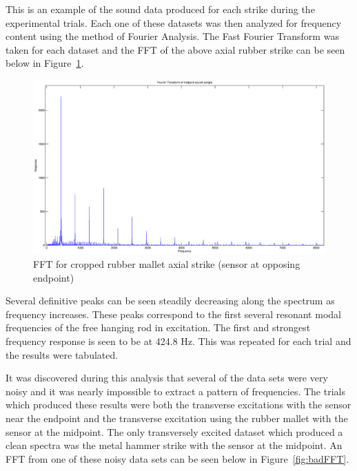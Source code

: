 This is an example of the sound data produced for each strike during the experimental trials. Each one of these datasets was then analyzed for frequency content using the method of Fourier Analysis. The Fast Fourier Transform was taken for each dataset and the FFT of the above axial rubber strike can be seen below in Figure~\ref{fig:axial_FFT}.

\begin{figure}[H]
	\centering
	\includegraphics[width=\textwidth]{../figures/axial_rubber_endpointFFT.eps}
	\caption{FFT for cropped rubber mallet axial strike (sensor at opposing endpoint)}
	\label{fig:axial_FFT}
\end{figure}

Several definitive peaks can be seen steadily decreasing along the spectrum as frequency increases. These peaks correspond to the first several resonant modal frequencies of the free hanging rod in excitation. The first and strongest frequency response is seen to be at 424.8 Hz. This was repeated for each trial and the results were tabulated. 

It was discovered during this analysis that several of the data sets were very noisy and it was nearly impossible to extract a pattern of frequencies. The trials which produced these results were both the transverse excitations with the sensor near the endpoint and the transverse excitation using the rubber mallet with the sensor at the midpoint. The only transversely excited dataset which produced a clean spectra was the metal hammer strike with the sensor at the midpoint. An FFT from one of these noisy data sets can be seen below in Figure~\ref{fig:badFFT}.

